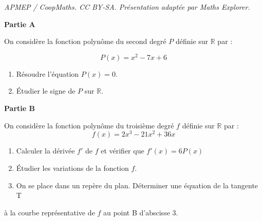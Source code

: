 \documentclass[10pt]{article}
\providecommand{\R}{\mathbb{R}}
\begin{document}
\noindent\textit{APMEP / CoopMaths. CC BY-SA. Présentation adaptée par Maths Explorer.}\par\medskip
\medskip

\textbf{Partie A}

\vspace{0.3cm}

On considère la fonction polynôme du second degré $P$ définie sur $ \R $ par :

\[P(x)=x^2-7x+6\]

\begin{enumerate}
\item  Résoudre l'équation $P(x)= 0$.
\item Étudier le signe de $P$ sur $\R$.
\end{enumerate}

\medskip

\textbf{Partie B}

\medskip

On considère la fonction polynôme du troisième degré $f$ définie sur $\R$ par :
\[f(x) = 2x^3 -21x^2 + 36x\]
\begin{enumerate}
\item  Calculer la dérivée $f'$ de $f$ et vérifier que $f'(x) = 6P(x)$
\item Étudier les variations de la fonction $f$.
\item On se place dans un repère du plan. Déterminer une équation de la tangente
T \end{enumerate}à la courbe représentative de $f$ au point B d'abscisse 3.

\vspace{0,5cm}
\end{document}
